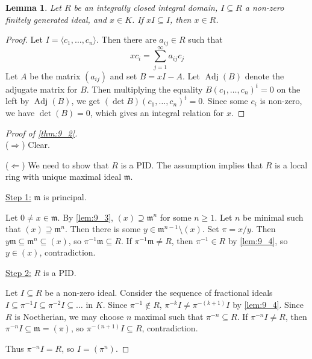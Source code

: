 \documentclass[11pt]{article}
\theoremstyle{definition}
\theoremstyle{plain}
\newtheorem{lemma}[definition]{Lemma}
\theoremstyle{remark}
\DeclareMathOperator{\Adj}{Adj}
\newcommand{\fm}{\mathfrak{m}}
\begin{document}
\begin{lemma}\label{lem:9_4}
    Let $R$ be an integrally closed integral domain, $I \subseteq R$ a non-zero finitely generated ideal, and $x \in K$. If $x I \subseteq I$, then $x \in R$.
\end{lemma}
\begin{proof}
    Let $I = \langle c_1, \ldots, c_n \rangle$. Then there are $a_{ij} \in R$ such that
    \begin{equation*}
        x c_i = \sum_{j=1}^\infty a_{ij} c_j
    \end{equation*}
    Let $A$ be the matrix $(a_{ij})$ and set $B = x I - A$. Let $\Adj(B)$ denote the adjugate matrix for $B$. Then multiplying the equality $B (c_1, \ldots, c_n)^t = 0$ on the left by $\Adj(B)$, we get $(\det{B}) (c_1, \ldots, c_n)^t = 0$. Since some $c_i$ is non-zero, we have $\det(B) = 0$, which gives an integral relation for $x$.
\end{proof}

\begin{proof}[Proof of \autoref{thm:9_2}]\phantom{}\\
    \noindent ($\Rightarrow$) Clear.

    \noindent ($\Leftarrow$) We need to show that $R$ is a PID. The assumption implies that $R$ is a local ring with unique maximal ideal $\fm$.

    \noindent \underline{Step 1:} $\fm$ is principal.

    Let $0 \neq x \in \fm$. By \autoref{lem:9_3}, $(x) \supseteq \fm^n$ for some $n \ge 1$. Let $n$ be minimal such that $(x) \supseteq \fm^n$. Then there is some $y \in \fm^{n-1} \setminus (x)$. Set $\pi = x / y$. Then $y \fm \subseteq \fm^n \subseteq (x)$, so $\pi^{-1} \fm \subseteq R$. If $\pi^{-1} \fm \neq R$, then $\pi^{-1} \in R$ by \autoref{lem:9_4}, so $y \in (x)$, contradiction.

    \noindent \underline{Step 2:} $R$ is a PID.

    Let $I \subseteq R$ be a non-zero ideal. Consider the sequence of fractional ideals $I \subseteq \pi^{-1} I \subseteq \pi^{-2} I \subseteq \ldots$ in $K$. Since $\pi^{-1} \notin R$, $\pi^{-k} I \neq \pi^{-(k+1)} I$ by \autoref{lem:9_4}. Since $R$ is Noetherian, we may choose $n$ maximal such that $\pi^{-n} \subseteq R$. If $\pi^{-n} I \neq R$, then $\pi^{-n} I \subseteq \fm = (\pi)$, so $\pi^{-(n+1)} I \subseteq R$, contradiction.

    Thus $\pi^{-n} I = R$, so $I = (\pi^n)$.
\end{proof}
\end{document}
